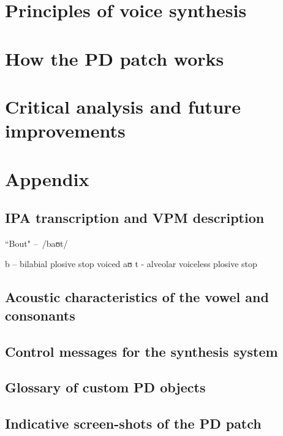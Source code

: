 



	
	\begin{multicols}{2}
	
		\section{Principles of voice synthesis}
		
		
		\section{How the PD patch works}
		
		
		\section{Critical analysis and future improvements}
		
		
	\end{multicols}
	
	\pagebreak
	
	\appendix
	\section{Appendix}
	
	\subsection{IPA transcription and VPM description}
	
	``Bout" – /baʊt/
	
	b  – bilabial plosive stop voiced
	aʊ
	t - alveolar voiceless plosive stop
	
	\subsection{Acoustic characteristics of the vowel and consonants}
	
	\subsection{Control messages for the synthesis system}
	
	\subsection{Glossary of custom PD objects}
	
	
	\subsection{Indicative screen-shots of the PD patch}
	
	
	



